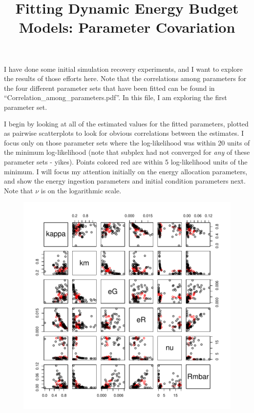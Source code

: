 \documentclass[12pt,reqno,final]{amsart}
\title[DEB fitting notes]{Fitting Dynamic Energy Budget Models:
  Parameter Covariation}
\theoremstyle{plain}
\numberwithin{equation}{part}
\begin{document}
\maketitle

I have done some initial simulation recovery experiments, and I want
to explore the results of those efforts here. Note that the
correlations among parameters for the four different parameter sets
that have been fitted can be found in
``Correlation\_among\_parameters.pdf''. In this file, I am exploring
the first parameter set.

I begin by looking at all of the estimated values for the fitted
parameters, plotted as pairwise scatterplots to look for obvious
correlations between the estimates. I focus only on those parameter
sets where the log-likelihood was within 20 units of the minimum
log-likelihood (note that subplex had not converged for \emph{any} of
these parameter sets - yikes). Points colored red are within 5
log-likelihood units of the minimum. I will focus my attention
initially on the energy allocation parameters, and show the energy
ingestion parameters and initial condition parameters next. Note that
$\nu$ is on the logarithmic scale.
\begin{figure}
\includegraphics{Solving_the_problem_of_parameter_covariation-001}
\end{figure}
\end{document}
